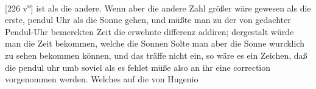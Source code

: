 [226 v\textsuperscript{o}] ist als die andere. Wenn aber die andere Zahl  gr\"{o}ßer w\"{a}re gewesen als die erste,  pendul Uhr\protect{}  als die Sonne gehen, und m\"{u}ßte man zu  der von gedachter Pendul-Uhr\protect{}  bemerckten Zeit die erwehnte  differenz addiren; dergestalt  w\"{u}rde man die Zeit bekommen, welche die Sonnen  Solte man aber die Sonne wurcklich zu sehen bekommen k\"{o}nnen, und das tr\"{a}ffe nicht ein, so w\"{a}re es ein Zeichen, daß die pendul uhr\protect{} umb soviel als es fehlet  m\"{u}ße also  an ihr eine correction vorgenommen  werden. Welches auf die von Hugenio
